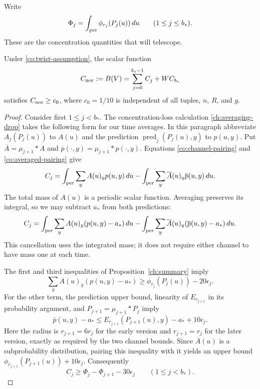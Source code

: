 Write
\[
 \Phi_j=\int_{\rm per}\phi_{r_j}(P_j(u))\,du
 \qquad(1\leq j\leq b_*).
\]
These are the concentration quantities that will telescope.

\begin{lemma}
\label{co:positivity}
Under \eqref{co:twist-assumption}, the scalar function
\begin{equation}
 C_{\rm nor}:=B(V)=\sum_{j=0}^{b_*-1}C_j+WC_{b_*}
 \label{co:normalizer}
\end{equation}
satisfies $C_{\rm nor}\geq c_0$, where $c_0=1/10$ is independent of all
tuples, $n$, $R$, and $g$.
\end{lemma}

\begin{proof}
Consider first $1\leq j<b_*$.  The concentration-loss calculation
\eqref{ch:averaging-drop} takes the following form for our time averages.
In this paragraph abbreviate
$A_j(P_j(u))$ to $A(u)$ and the prediction
$\operatorname{pred}_j(P_j(u),y)$ to $p(u,y)$.  Put
$\overline A=\mu_{j+1}*A$ and
$\overline p(\cdot,y)=\mu_{j+1}*p(\cdot,y)$.  Equations
\eqref{co:channel-pairing} and \eqref{co:averaged-pairing} give
\[
 C_j=\int_{\rm per}\sum_y A(u)_y p(u,y)\,du
      -\int_{\rm per}\sum_y\overline A(u)_y\overline p(u,y)\,du.
\]
The total mass of $A(u)$ is a periodic scalar function.  Averaging
preserves its integral, so we may subtract $a_*$ from both predictions:
\begin{equation}
 C_j=\int_{\rm per}\sum_y A(u)_y(p(u,y)-a_*)\,du
      -\int_{\rm per}\sum_y\overline A(u)_y
                         (\overline p(u,y)-a_*)\,du.
 \label{co:subtract-threshold}
\end{equation}
This cancellation uses the integrated mass; it does not require either
channel to have mass one at each time.

The first and third inequalities of Proposition~\ref{ch:summary} imply
\[
 \sum_y A(u)_y(p(u,y)-a_*)
 \geq\phi_{r_j}(P_j(u))-20\epsilon_j.
\]
For the other term, the prediction upper bound, linearity of
$E_{r_{j+1}}$ in its probability argument, and
$P_{j+1}=\mu_{j+1}*P_j$ imply
\[
 \overline p(u,y)-a_*
 \leq E_{r_{j+1}}(P_{j+1}(u),y)-a_*+10\epsilon_j.
\]
Here the radius is $r_{j+1}=6r_j$ for the early version and
$r_{j+1}=r_j$ for the later version, exactly as required by the two
channel bounds.  Since $\overline A(u)$ is a subprobability distribution,
pairing this inequality with it yields an upper bound
$\phi_{r_{j+1}}(P_{j+1}(u))+10\epsilon_j$.  Consequently
\begin{equation}
 C_j\geq\Phi_j-\Phi_{j+1}-30\epsilon_j
 \qquad(1\leq j<b_*).
 \label{co:telescope}
\end{equation}


\end{proof}
